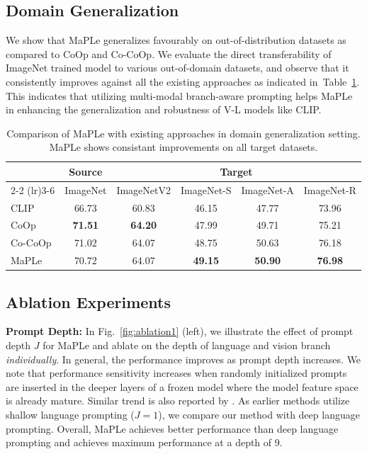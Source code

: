 \documentclass[10pt,twocolumn,letterpaper]{article}
\newcommand{\tablestyle}[2]{\setlength{\tabcolsep}{#1}\renewcommand{\arraystretch}{#2}\centering\footnotesize}
\begin{document}
\subsection{Domain Generalization}
\vspace{-0.1in}
\noindent We show that MaPLe generalizes favourably on out-of-distribution datasets as compared to CoOp and Co-CoOp. We evaluate the direct transferability of ImageNet trained model to various out-of-domain datasets, and observe that it consistently improves against all the existing approaches as indicated in~Table~\ref{tab:robustness}. This indicates that utilizing multi-modal branch-aware prompting helps MaPLe in enhancing the generalization and robustness of V-L models like CLIP.

\begin{table}[!t]
    \centering
\tablestyle{6pt}{1.1}
\addtolength{\tabcolsep}{-4.5pt}
    \begin{tabular}{l ccccc}
    \toprule
    & \textbf{Source} & \multicolumn{4}{c}{\textbf{Target}} \\ \cmidrule(lr){2-2} \cmidrule(lr){3-6}
     & ImageNet & ImageNetV2 & ImageNet-S & ImageNet-A & ImageNet-R \\
    \midrule
    CLIP &  66.73 & 60.83 & {46.15} & 47.77 & {73.96} \\
    CoOp &  \textbf{71.51} & \textbf{64.20} & 47.99  & 49.71  & 75.21  \\
    Co-CoOp & 71.02 & {64.07} & 48.75 & 50.63 & 76.18  \\
    \midrule
    \rowcolor{tabhighlight} MaPLe & 70.72 & {64.07} & \textbf{49.15} & \textbf{50.90}  & \textbf{76.98} \\
    \bottomrule
    \end{tabular}
        \caption{ Comparison of MaPLe with existing approaches in domain generalization setting. MaPLe shows consistant improvements on all target datasets.
    }
    \label{tab:robustness}
\end{table}

\subsection{Ablation Experiments}
\noindent \textbf{Prompt Depth:} 
\noindent In Fig.~\ref{fig:ablation1} (left), we illustrate the effect of prompt depth $J$ for MaPLe and ablate on the depth of language and vision branch \emph{individually}. In general, the performance improves as prompt depth increases. We note that performance sensitivity increases when randomly initialized prompts are inserted in the deeper layers of a frozen model where the model feature space is already mature. Similar trend is also reported by \cite{jia2022visual}. As earlier methods utilize shallow language prompting ($J=1$), we compare our method with deep language prompting. Overall, MaPLe achieves better performance than deep language prompting and achieves maximum performance at a depth of 9. 
\end{document}
